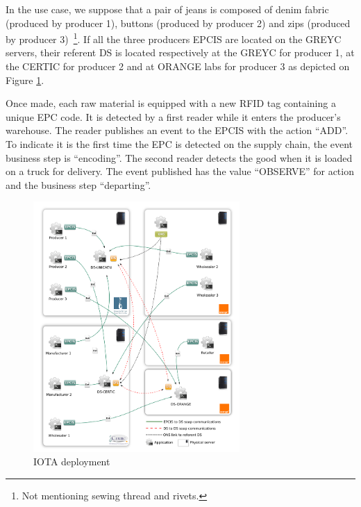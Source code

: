 \documentclass[a4paper]{llncs}
\begin{document}
In the use case, we suppose that a pair of jeans is composed of denim fabric
(produced by producer 1), buttons (produced by producer 2) and zips (produced
by producer 3)~\footnote{Not mentioning sewing thread and rivets.}. If all the
three producers EPCIS are located on the GREYC servers, their referent DS is
located respectively at the GREYC for producer 1, at the CERTIC for producer 2
and at ORANGE labs for producer 3 as depicted on Figure \ref{fig:iota}.


Once made, each raw material is equipped with a new RFID tag containing a
unique EPC code. It is detected by a first reader while it enters the
producer's warehouse.  The reader publishes an event to the EPCIS with the
action ``ADD''. To indicate it is the first time the EPC is detected on the
supply chain, the event business step is ``encoding''.  The second reader
detects the good when it is loaded on a truck for delivery.  The event
published has the value ``OBSERVE'' for action and the business step
``departing''.


\begin{figure}[htb]
\centering
\includegraphics[width=0.7\textwidth]{iota_visuel/iota_log_paper.png}
\caption{IOTA deployment}
\label{fig:iota}
\end{figure}
\end{document}
